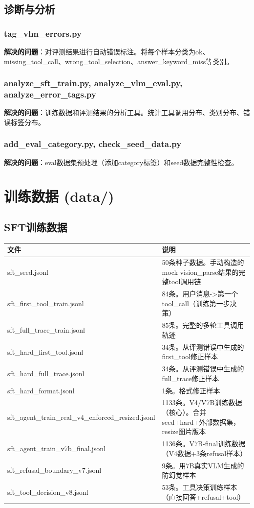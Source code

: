 \documentclass[fontset=none,11pt,a4paper]{ctexart}
\begin{document}
\subsection{诊断与分析}

\subsubsection{tag\_vlm\_errors.py}

\textbf{解决的问题}：对评测结果进行自动错误标注。将每个样本分类为ok、missing\_tool\_call、wrong\_tool\_selection、answer\_keyword\_miss等类别。

\subsubsection{analyze\_sft\_train.py, analyze\_vlm\_eval.py, analyze\_error\_tags.py}

\textbf{解决的问题}：训练数据和评测结果的分析工具。统计工具调用分布、类别分布、错误标签分布。

\subsubsection{add\_eval\_category.py, check\_seed\_data.py}

\textbf{解决的问题}：eval数据集预处理（添加category标签）和seed数据完整性检查。

\section{训练数据 (data/)}

\subsection{SFT训练数据}

\begin{longtable}{lp{9cm}}
\toprule
文件 & 说明 \\
\midrule
sft\_seed.jsonl & 50条种子数据。手动构造的mock vision\_parse结果的完整tool调用链 \\
sft\_first\_tool\_train.jsonl & 84条。用户消息->第一个tool\_call（训练第一步决策） \\
sft\_full\_trace\_train.jsonl & 85条。完整的多轮工具调用轨迹 \\
sft\_hard\_first\_tool.jsonl & 34条。从评测错误中生成的first\_tool修正样本 \\
sft\_hard\_full\_trace.jsonl & 34条。从评测错误中生成的full\_trace修正样本 \\
sft\_hard\_format.jsonl & 1条。格式修正样本 \\
sft\_agent\_train\_real\_v4\_enforced\_resized.jsonl & 1133条。V4/V7B训练数据（核心）。合并seed+hard+外部数据集，resize图片版本 \\
sft\_agent\_train\_v7b\_final.jsonl & 1136条。V7B-final训练数据（V4数据+3条refusal样本） \\
sft\_refusal\_boundary\_v7.jsonl & 9条。用7B真实VLM生成的防幻觉样本 \\
sft\_tool\_decision\_v8.jsonl & 53条。工具决策训练样本（直接回答+refusal+tool） \\
\bottomrule
\end{longtable}
\end{document}
